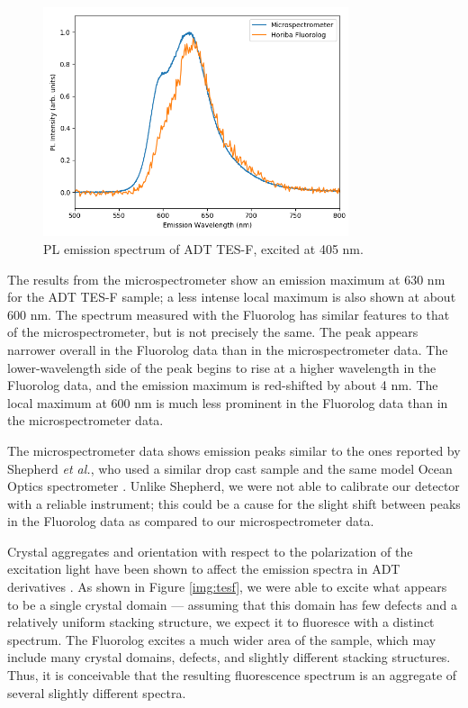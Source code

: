 \begin{figure}[H]
    \centering
    \includegraphics[width=0.8\textwidth]{./img/tesf-2.png}%
    \caption[PL emission spectrum of ADT TES-F, excited at 405nm.]{PL emission spectrum of ADT TES-F, excited at 405 nm.}
    \label{fig:pl-adt-tesf}
\end{figure}

The results from the microspectrometer show an emission maximum at 630 nm for the ADT TES-F sample; a less intense local maximum is also shown at about 600 nm. The spectrum measured with the Fluorolog has similar features to that of the microspectrometer, but is not precisely the same. The peak appears narrower overall in the Fluorolog data than in the microspectrometer data. The lower-wavelength side of the peak begins to rise at a higher wavelength in the Fluorolog data, and the emission maximum is red-shifted by about 4 nm. The local maximum at 600 nm is much less prominent in the Fluorolog data than in the microspectrometer data.

The microspectrometer data shows emission peaks similar to the ones reported by Shepherd \emph{et al.}, who used a similar drop cast sample and the same model Ocean Optics spectrometer \cite{e._b._shepherd_effect_2011, shepherd_optical_2010}. Unlike Shepherd, we were not able to calibrate our detector with a reliable instrument; this could be a cause for the slight shift between peaks in the Fluorolog data as compared to our microspectrometer data.

Crystal aggregates and orientation with respect to the polarization of the excitation light have been shown to affect the emission spectra in ADT derivatives \cite{lam_polarization_2018}. As shown in Figure \ref{img:tesf}, we were able to excite what appears to be a single crystal domain --- assuming that this domain has few defects and a relatively uniform stacking structure, we expect it to fluoresce with a distinct spectrum. The Fluorolog excites a much wider area of the sample, which may include many crystal domains, defects, and slightly different stacking structures. Thus, it is conceivable that the resulting fluorescence spectrum is an aggregate of several slightly different spectra.

